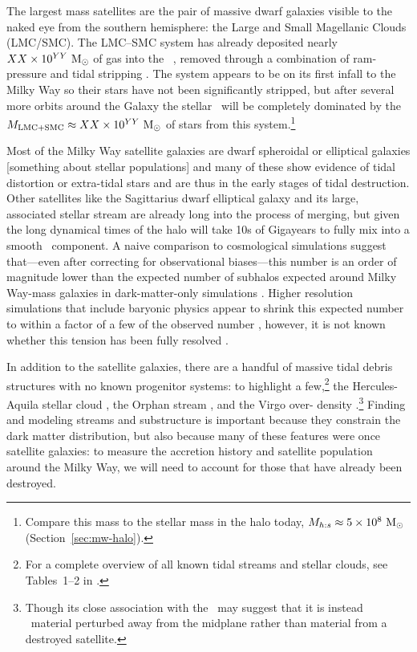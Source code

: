 The largest mass satellites are the pair of massive dwarf galaxies visible to
the naked eye from the southern hemisphere: the Large and Small Magellanic
Clouds (LMC/SMC). The LMC--SMC system has already deposited nearly $XX \times
10^{YY}~\mathrm{M}_\odot$ of gas into the \mwhalo\ \citep{putman-todo}, removed through a
combination of ram-pressure and tidal stripping \citep{salem-todo}. The system
appears to be on its first infall to the Milky Way \citep{besla10} so their
stars have not been significantly stripped, but after several more orbits around
the Galaxy the stellar \mwhalo\ will be completely dominated by the $M_{\rm
LMC+SMC} \approx XX \times 10^{YY}~\mathrm{M}_\odot$ of stars from this
system.\footnote{Compare this mass to the stellar mass in the halo today,
$M_{h:s} \approx 5 \times 10^8~\mathrm{M}_\odot$ (Section~\ref{sec:mw-halo}).}

Most of the Milky Way satellite galaxies are dwarf spheroidal or elliptical
galaxies [something about stellar populations] and many of these show evidence
of tidal distortion or extra-tidal stars \citep[e.g.,][]{todo-hercules, todo}
and are thus in the early stages of tidal destruction. Other satellites like the
Sagittarius dwarf elliptical galaxy and its large, associated stellar stream are
already long into the process of merging, but given the long dynamical times of
the halo will take 10s of Gigayears to fully mix into a smooth \mwhalo\
component. A naive comparison to cosmological simulations suggest that---even
after correcting for observational biases---this number is an order of magnitude
lower than the expected number of subhalos expected around Milky Way-mass
galaxies in dark-matter-only simulations \citep[$\sim$1000;][]{missing-
satellites-todo}. Higher resolution simulations that include baryonic physics
appear to shrink this expected number to within a factor of a few of the
observed number \citep{todo}, however, it is not known whether this tension has
been fully resolved \citep{todo}.

In addition to the satellite galaxies, there are a handful of massive tidal
debris structures with no known progenitor systems: to highlight a
few,\footnote{For a complete overview of all known tidal streams and stellar
clouds, see Tables~1--2 in \cite{grillmair16}.} the Hercules-Aquila stellar
cloud \citep{todo}, the Orphan stream \citep{newberg02}, and the Virgo over-
density \citep{todo}.\footnote{Though its close association with the \mwdisk\
may suggest that it is instead \mwdisk\ material perturbed away from the
midplane rather than material from a destroyed satellite.} Finding and modeling
streams and substructure is important because they constrain the dark matter
distribution, but also because many of these features were once satellite
galaxies: to measure the accretion history and satellite population around the
Milky Way, we will need to account for those that have already been destroyed.


